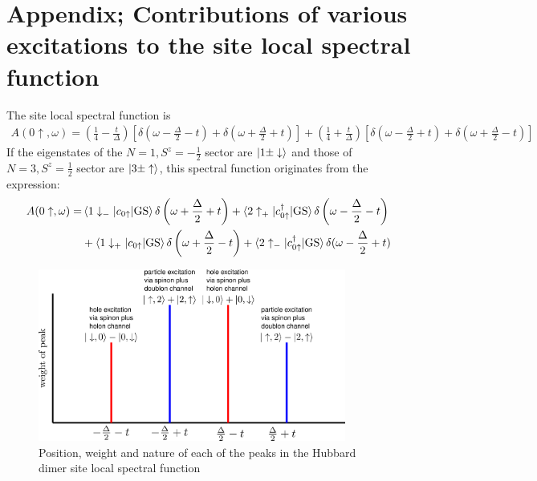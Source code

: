 \documentclass{article}
\numberwithin{equation}{section}
\begin{document}
\section*{Appendix; Contributions of various excitations to the site local spectral function}
The site local spectral function is
\begin{equation}\begin{aligned}
	A(0\uparrow, \omega) = \left( \frac{1}{4} - \frac{t}{\Delta} \right)\left[\delta(\omega - \frac{\Delta}{2} - t) + \delta(\omega + \frac{\Delta}{2} + t)\right]\nonumber + \left( \frac{1}{4} + \frac{t}{\Delta} \right) \left[\delta(\omega - \frac{\Delta}{2} + t) + \delta(\omega + \frac{\Delta}{2} - t)\right]
\end{aligned}\end{equation}
If the eigenstates of the $N=1, S^z = - \frac{1}{2}$ sector are $\ket{1 \pm \downarrow}$ and those of $N=3, S^z = \frac{1}{2}$ sector are $\ket{3 \pm \uparrow}$, this spectral function originates from the expression:
\begin{equation}\begin{aligned}
	A(0\uparrow, \omega) =& \braket{1 \downarrow_- | c_{0 \uparrow} | \text{GS}} \delta\left(\omega + \frac{\Delta}{2} + t\right) + \braket{2 \uparrow_+ | c^\dagger_{0 \uparrow} | \text{GS}}\delta\left(\omega - \frac{\Delta}{2} - t\right) \\
			      &+ \braket{1 \downarrow_+ | c_{0 \uparrow} | \text{GS}}\delta\left(\omega + \frac{\Delta}{2} - t\right) + \braket{2 \uparrow_- | c^\dagger_{0 \uparrow} | \text{GS}}\delta(\omega - \frac{\Delta}{2} + t)
\end{aligned}\end{equation}
\begin{figure}[htpb]
	\centering
	\includegraphics[width=0.9\textwidth]{dimer-peaks.png}
	\caption{Position, weight and nature of each of the peaks in the Hubbard dimer site local spectral function}
\end{figure}
\end{document}
